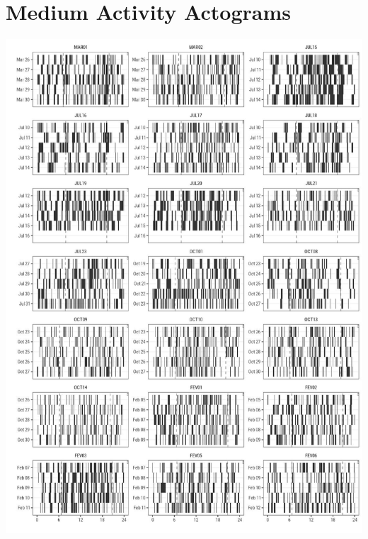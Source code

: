 \documentclass[msc,numbers,hidelinks]{coppe}
\begin{document}
  \hypertarget{medium-activity-actograms}{%
  \section{Medium Activity Actograms}\label{medium-activity-actograms}}
  \begin{center}\includegraphics[width=1\linewidth]{../04_figures/actograms/actograms_medium} \end{center}
\end{document}
